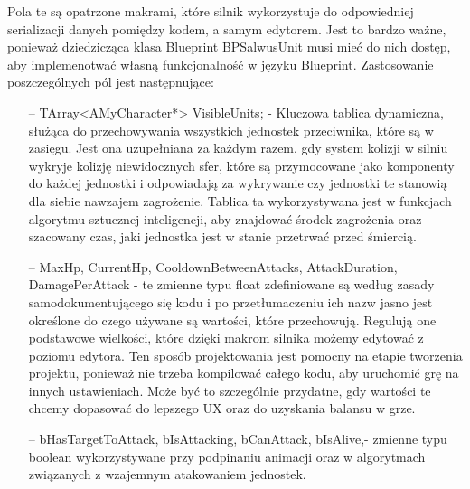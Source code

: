 \documentclass[12pt]{report}
\begin{document}
Pola te są opatrzone makrami, które silnik wykorzystuje do odpowiedniej serializacji danych pomiędzy kodem, a samym edytorem. Jest to bardzo ważne, ponieważ dziedzicząca klasa Blueprint BPSalwusUnit musi mieć do nich dostęp, aby implemenotwać własną funkcjonalność w języku Blueprint. Zastosowanie poszczególnych pól jest następnujące:
\begin{itemize}
\item[--] TArray<AMyCharacter*> VisibleUnits; - Kluczowa tablica dynamiczna, służąca do przechowywania wszystkich jednostek przeciwnika, które są w zasięgu. Jest ona uzupełniana za każdym razem, gdy system kolizji w silniu wykryje kolizję niewidocznych sfer, które są przymocowane jako komponenty do każdej jednostki i odpowiadają za wykrywanie czy jednostki te stanowią dla siebie nawzajem zagrożenie. Tablica ta wykorzystywana jest w funkcjach algorytmu sztucznej inteligencji, aby znajdować środek zagrożenia oraz szacowany czas, jaki jednostka jest w stanie przetrwać przed śmiercią.
\item[--] MaxHp, CurrentHp, CooldownBetweenAttacks, AttackDuration, DamagePerAttack - te zmienne typu float zdefiniowane są według zasady samodokumentującego się kodu i po przetłumaczeniu ich nazw jasno jest określone do czego używane są wartości, które przechowują. Regulują one podstawowe wielkości, które dzięki makrom silnika możemy edytować z poziomu edytora. Ten sposób projektowania jest pomocny na etapie tworzenia projektu, ponieważ nie trzeba kompilować całego kodu, aby uruchomić grę na innych ustawieniach. Może być to szczególnie przydatne, gdy wartości te chcemy dopasować do lepszego UX oraz do uzyskania balansu w grze.
\item[--] bHasTargetToAttack, bIsAttacking, bCanAttack, bIsAlive,- zmienne typu boolean wykorzystywane przy podpinaniu animacji oraz w algorytmach związanych z wzajemnym atakowaniem jednostek.

\end{itemize}
\end{document}
